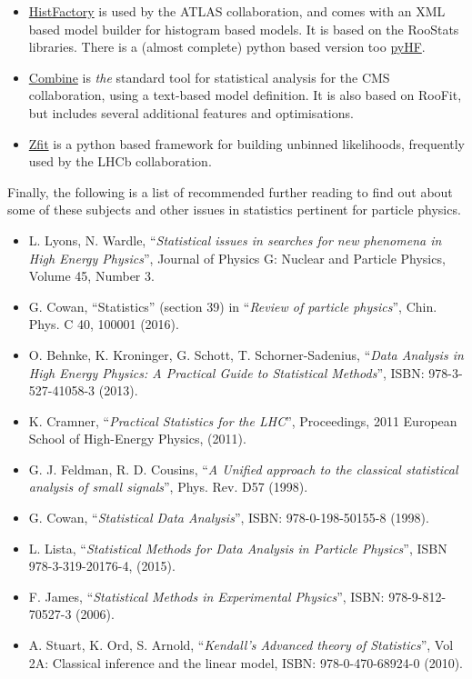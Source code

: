 \begin{itemize}
    \item \href{https://cds.cern.ch/record/1456844/files/CERN-OPEN-2012-016.pdf}{\textsf{HistFactory}} is used by the ATLAS collaboration, and comes with an XML based model builder for histogram based models. It is based on the \textsf{RooStats} libraries. There is a (almost complete) python based version too \href{https://scikit-hep.org/pyhf/}{\textsf{pyHF}}.
    \item \href{http://cms-analysis.github.io/HiggsAnalysis-CombinedLimit/}{\textsf{Combine}} is \emph{the} standard tool for statistical analysis for the CMS collaboration, using a text-based model definition. It is also based on \textsf{RooFit}, but includes several additional features and optimisations.
    \item \href{https://github.com/zfit/zfit}{\textsf{Zfit}} is a python based framework for building unbinned likelihoods, frequently used by the LHCb collaboration. 
\end{itemize}


Finally, the following is a list of recommended further reading to find out about some of these subjects and other issues in statistics pertinent for particle physics. 
\begin{itemize}
    \item L. Lyons, N. Wardle, ``\emph{Statistical issues in searches for new phenomena in High Energy Physics}'', Journal of Physics G: Nuclear and Particle Physics, Volume 45, Number 3. 
    \item  G. Cowan, ``Statistics'' (section 39) in ``\emph{Review of particle physics}'', Chin. Phys. C 40, 100001 (2016).
    \item O. Behnke, K. Kroninger, G. Schott, T.  Schorner-Sadenius, ``\emph{Data Analysis in High Energy Physics: A Practical Guide to Statistical Methods}'', ISBN: 978-3-527-41058-3 (2013).
    \item K. Cramner, ``\emph{Practical Statistics for the LHC}'', Proceedings, 2011 European School of High-Energy Physics, (2011).
    \item G. J. Feldman, R. D. Cousins, ``\emph{A Unified approach to the classical statistical analysis of small signals}'', Phys. Rev. D57 (1998).
    \item G. Cowan, ``\emph{Statistical Data Analysis}'', ISBN: 978-0-198-50155-8 (1998).
    \item L. Lista, ``\emph{Statistical Methods for Data Analysis in Particle Physics}'', ISBN 978-3-319-20176-4, (2015).
    \item F. James, ``\emph{Statistical Methods in Experimental Physics}'', ISBN: 978-9-812-70527-3 (2006). 
    \item A. Stuart, K. Ord, S. Arnold, ``\emph{Kendall's Advanced theory of Statistics}'', Vol 2A: Classical inference and the linear model, ISBN: 978-0-470-68924-0 (2010). 
\end{itemize}